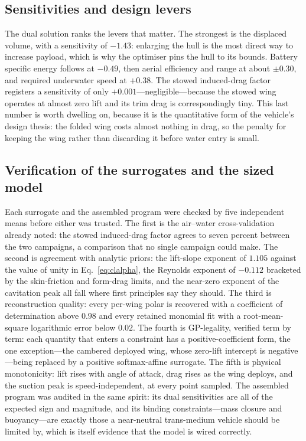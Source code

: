 \documentclass[conf]{new-aiaa}
\begin{document}
\subsection{Sensitivities and design levers}
The dual solution ranks the levers that matter. The strongest is the displaced volume, with a
sensitivity of $-1.43$: enlarging the hull is the most direct way to increase payload, which is why
the optimiser pins the hull to its bounds. Battery specific energy follows at $-0.49$, then aerial
efficiency and range at about $\pm0.30$, and required underwater speed at $+0.38$. The stowed
induced-drag factor registers a sensitivity of only $+0.001$---negligible---because the stowed wing
operates at almost zero lift and its trim drag is correspondingly tiny. This last number is worth
dwelling on, because it is the quantitative form of the vehicle's design thesis: the folded wing
costs almost nothing in drag, so the penalty for keeping the wing rather than discarding it before
water entry is small.

\subsection{Verification of the surrogates and the sized model}
Each surrogate and the assembled program were checked by five independent means before either was
trusted. The first is the air--water cross-validation already noted: the stowed induced-drag factor
agrees to seven percent between the two campaigns, a comparison that no single campaign could make.
The second is agreement with analytic priors: the lift-slope exponent of $1.105$ against the value of
unity in Eq.~\eqref{eq:clalpha}, the Reynolds exponent of $-0.112$ bracketed by the skin-friction and
form-drag limits, and the near-zero exponent of the cavitation peak all fall where first principles
say they should. The third is reconstruction quality: every per-wing polar is recovered with a
coefficient of determination above $0.98$ and every retained monomial fit with a root-mean-square
logarithmic error below $0.02$. The fourth is GP-legality, verified term by term: each quantity that
enters a constraint has a positive-coefficient form, the one exception---the cambered deployed wing,
whose zero-lift intercept is negative---being replaced by a positive softmax-affine surrogate. The
fifth is physical monotonicity: lift rises with angle of attack, drag rises as the wing deploys, and
the suction peak is speed-independent, at every point sampled. The assembled program was audited in
the same spirit: its dual sensitivities are all of the expected sign and magnitude, and its binding
constraints---mass closure and buoyancy---are exactly those a near-neutral trans-medium vehicle
should be limited by, which is itself evidence that the model is wired correctly.
\end{document}
